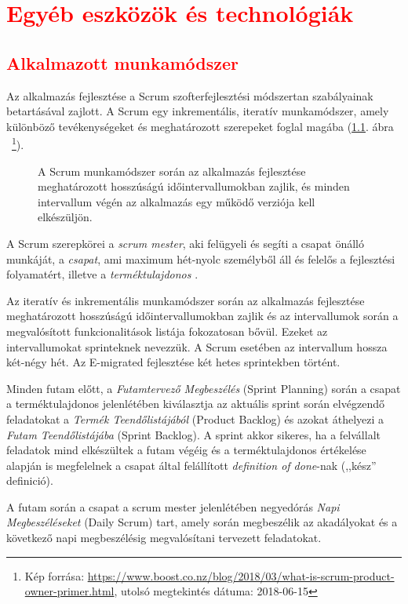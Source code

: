 \chapter{\textcolor{red}{Egyéb eszközök és technológiák}}\label{ch:egyebb_eszkozok}
\section{\textcolor{red}{Alkalmazott munkamódszer}}
Az alkalmazás fejlesztése a Scrum szofterfejlesztési módszertan szabályainak betartásával zajlott. A Scrum egy inkrementális, iteratív munkamódszer, amely különböző tevékenységeket és meghatározott szerepeket foglal magába (\ref{fig:scrum}. ábra ~\footnote{Kép forrása: \url{https://www.boost.co.nz/blog/2018/03/what-is-scrum-product-owner-primer.html}, utolsó megtekintés dátuma: 2018-06-15}). 
\begin{figure}
  \centering
  \caption{A Scrum munkamódszer során az alkalmazás fejlesztése meghatározott hosszúságú időintervallumokban zajlik, és minden intervallum végén az alkalmazás egy működő verziója kell elkészüljön.}
  \label{fig:scrum}
\end{figure}
A Scrum szerepkörei a \textit{scrum mester}, aki felügyeli és segíti a csapat önálló munkáját, a \textit{csapat}, ami maximum hét-nyolc személyből áll és felelős a fejlesztési folyamatért, illetve a \textit{terméktulajdonos} \cite{Scrum}. 

Az iteratív és inkrementális munkamódszer során az alkalmazás fejlesztése meghatározott hosszúságú időintervallumokban zajlik és az intervallumok során a megvalósított funkcionalitások listája fokozatosan bővül. Ezeket az intervallumokat sprinteknek nevezzük. A Scrum esetében az intervallum hossza két-négy hét. Az E-migrated fejlesztése két hetes sprintekben történt.

Minden futam előtt, a \textit{Futamtervező Megbeszélés} (Sprint Planning) során a csapat a terméktulajdonos jelenlétében kiválasztja az aktuális sprint során elvégzendő feladatokat a \textit{Termék Teendőlistájából} (Product Backlog) és azokat áthelyezi a \textit{Futam Teendőlistájába} (Sprint Backlog). A sprint akkor sikeres, ha a felvállalt feladatok mind elkészültek a futam végéig és a terméktulajdonos értékelése alapján is megfelelnek a csapat által felállított \textit{definition of done}-nak (,,kész'' definició). 

A futam során a csapat a scrum mester jelenlétében negyedórás \textit{Napi Megbeszéléseket} (Daily Scrum) tart, amely során megbeszélik az akadályokat és a következő napi megbeszélésig megvalósítani tervezett feladatokat. 

